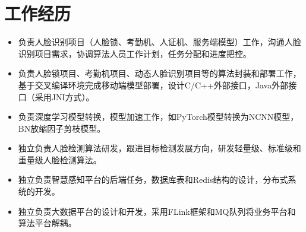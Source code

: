 \documentclass{resume}
\begin{document}
\section{工作经历}
\begin{itemize}
  \item 负责人脸识别项目（人脸锁、考勤机、人证机、服务端模型）工作，沟通人脸识别项目需求，协调算法人员工作计划，任务分配和进度把控。
  \item 负责人脸锁项目、考勤机项目、动态人脸识别项目等的算法封装和部署工作，基于交叉编译环境完成移动端模型部署，设计C/C++外部接口，Java外部接口（采用JNI方式）。
  \item 负责深度学习模型转换，模型加速工作，如PyTorch模型转换为NCNN模型，BN放缩因子剪枝模型。
  \item 独立负责人脸检测算法研发，跟进目标检测发展方向，研发轻量级、标准级和重量级人脸检测算法。
\end{itemize}
\begin{itemize}
  \item 独立负责智慧感知平台的后端任务，数据库表和Redis结构的设计，分布式系统的开发。
  \item 独立负责大数据平台的设计和开发，采用FLink框架和MQ队列将业务平台和算法平台解耦。
\end{itemize}
\end{document}
